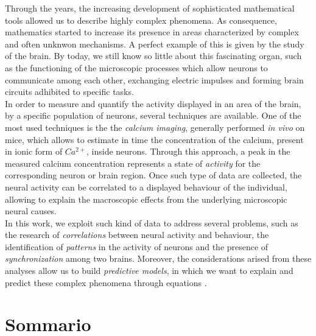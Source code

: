 \documentclass[12pt, a4paper]{report}
\begin{document}
	Through the years, the increasing development of sophisticated mathematical tools allowed us to describe highly complex phenomena. As consequence, mathematics started to increase its presence in areas characterized by complex and often unknwon mechanisms.  A perfect example of this is given by the study of the brain. By today, we still know so little about this fascinating organ, such as the functioning of the microscopic processes which allow neurons to communicate among each other, exchanging electric impulses and forming brain circuits adhibited to specific tasks.\\
In order to measure and quantify the activity displayed in an area of the brain, by a specific population of neurons, several techniques are available. One of the most used techniques is the the \textit{calcium imaging}, generally performed \textit{in vivo} on mice, which allows to estimate in time the concentration of the calcium, present in ionic form of $Ca^{2+}$, inside neurons. Through this approach, a peak in the measured calcium concentration represents a state of \textit{activity} for the corresponding neuron or brain region. Once such type of data are collected, the neural activity can be correlated to a displayed behaviour of the individual, allowing to explain the macroscopic effects from the underlying microscopic neural causes.\\
In this work, we exploit such kind of data to address several problems, such as the research of \textit{correlations} between neural activity and behaviour, the identification of \textit{patterns} in the activity of neurons and the presence of \textit{synchronization} among two brains. Moreover, the considerations arised from these analyses allow us to build \textit{predictive models}, in which we want to explain and predict these complex phenomena through equations .\\

	
	\chapter*{Sommario}
		
\end{document}
